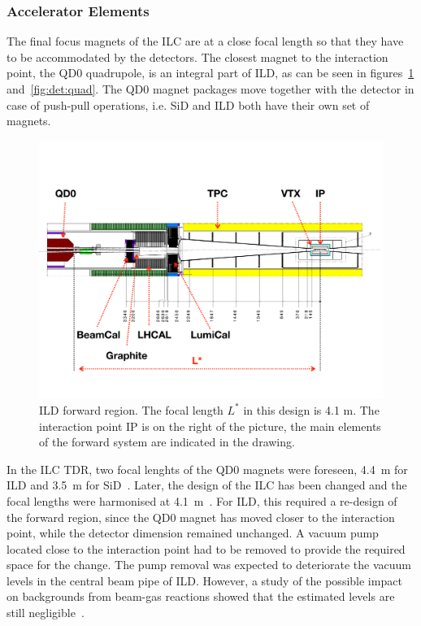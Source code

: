 \subsubsection{Accelerator Elements}
The final focus magnets of the ILC are at a close focal length so that they have to be accommodated by the detectors. The closest magnet to the interaction point, the QD0 quadrupole, is an integral part of ILD, as can be seen in figures~\ref{ild:fig:Forward_QD0} and~\ref{fig:det:quad}. The QD0 magnet packages move together with the detector in case of push-pull operations, i.e. SiD and ILD both have their own set of magnets.
\begin{figure}[h!]
\centering
\includegraphics[width=0.8\hsize]{ILC/figs/ILD_Forward_Region.pdf}
\caption{\label{ild:fig:Forward_QD0}ILD forward region. The focal length $L^*$ in this design is 4.1 m. The interaction point IP is on the right of the picture, the main elements of the forward system are indicated in the drawing.}
\end{figure}
In the ILC TDR, two focal lenghts of the QD0 magnets were foreseen, 4.4~m for ILD and 3.5~m for SiD~\cite{Behnke:2013xla}. Later, the design of the ILC has been changed and the focal lengths were harmonised at 4.1~m~\cite{ild:bib:lstar_cr}. For ILD, this required a re-design of the forward region, since the QD0 magnet has moved closer to the interaction point, while the detector dimension remained unchanged. A vacuum pump located close to the interaction point had to be removed to provide the required space for the change. The pump removal was expected to deteriorate the vacuum levels in the central beam pipe of ILD. However, a study of the possible impact on backgrounds from beam-gas reactions showed that the estimated levels are still negligible~\cite{ild:bib:beam_gas}.
